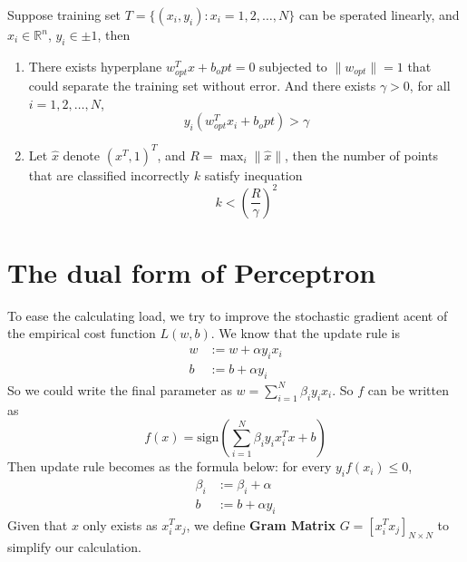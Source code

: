 \begin{thm}[Novikoff]
    Suppose training set $T=\{(x_i,y_i):x_i=1,2,\ldots,N\}$ can be sperated linearly, and $x_i\in \mathbb{R}^n$, $y_i\in{\pm 1}$, then
    \begin{enumerate}
        \item There exists hyperplane $w_{opt}^Tx+b_opt=0$ subjected to $\lVert w_{opt}\rVert=1$ that could separate the training set without error. And there exists $\gamma > 0$, for all 
        $i=1,2,\ldots,N$, \[y_i(w_{opt}^Tx_i+b_opt)>\gamma\]
        \item Let $\hat{x}$ denote $(x^T,1)^T$, and $R=\max_{i}\lVert \hat{x}\rVert$, then the number of points that are classified incorrectly $k$ satisfy inequation\[k<\left(\frac{R}{\gamma}\right)^2\]
    \end{enumerate}  
\end{thm}

\section{The dual form of Perceptron}

To ease the calculating load, we try to improve the stochastic gradient acent of the empirical cost function $L(w,b)$. We know that the update rule is
\begin{align*}
    w &:= w+\alpha y_ix_i\\
    b &:= b+\alpha y_i
\end{align*}
So we could write the final parameter as $w=\sum_{i=1}^N \beta_iy_ix_i$. So $f$ can be written as 
\[f(x)= \text{sign}(\sum_{i=1}^N \beta_iy_ix_i^Tx+b)\]
Then update rule becomes as the formula below: for every $y_if(x_i) \leq 0$,
\begin{align*}
    \beta_i &:= \beta_i+\alpha\\
    b &:= b+\alpha y_i
\end{align*}
Given that $x$ only exists as $x_i^Tx_j$, we define \textbf{Gram Matrix} $G=[x_i^Tx_j]_{N\times N}$ to simplify our calculation.